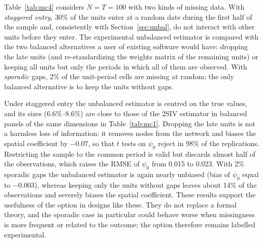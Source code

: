 Table~\ref{tab:mc4} considers $N=T=100$ with two kinds of missing data.
With \emph{staggered entry}, 30\% of the units enter at a random date
during the first half of the sample and, consistently with
Section~\ref{sec:unbal}, do not interact with other units before they
enter. The experimental unbalanced estimator is compared with the two
balanced alternatives a user of existing software would have: dropping the
late units (and re-standardizing the weights matrix of the remaining units)
or keeping all units but only the periods in which all of them are
observed. With \emph{sporadic} gaps, 2\% of the unit-period cells are
missing at random; the only balanced alternative is to keep the units
without gaps.

\begin{table}[t!]
\centering\scriptsize
{\setlength{\tabcolsep}{4pt}}
\caption{Unbalanced panels, $N=T=100$: average number of observations used,
bias, RMSE, and size (\%) of 5\% $t$ tests. 1{,}000 replications.}
\label{tab:mc4}
\end{table}

Under staggered entry the unbalanced estimator is centred on the true
values, and its sizes (6.6\%--8.6\%) are close to those of the 2SIV
estimator in balanced panels of the same dimensions in
Table~\ref{tab:mc1}. Dropping the late units is not a harmless loss of
information: it removes nodes from the network and biases the spatial
coefficient by $-0.07$, so that $t$ tests on $\psi_0$ reject in 98\% of the
replications. Restricting the sample to the common period is valid but
discards almost half of the observations, which raises the RMSE of $\psi_0$
from 0.015 to 0.023. With 2\% sporadic gaps the unbalanced estimator is again
nearly unbiased (bias of $\psi_0$ equal to $-0.003$), whereas keeping only
the units without gaps leaves about 14\% of the observations and severely
biases the spatial coefficient. These results support the usefulness of the
option in designs like these. They do not replace a formal theory, and the
sporadic case in particular could behave worse when missingness is more
frequent or related to the outcome; the option therefore remains labelled
experimental.
